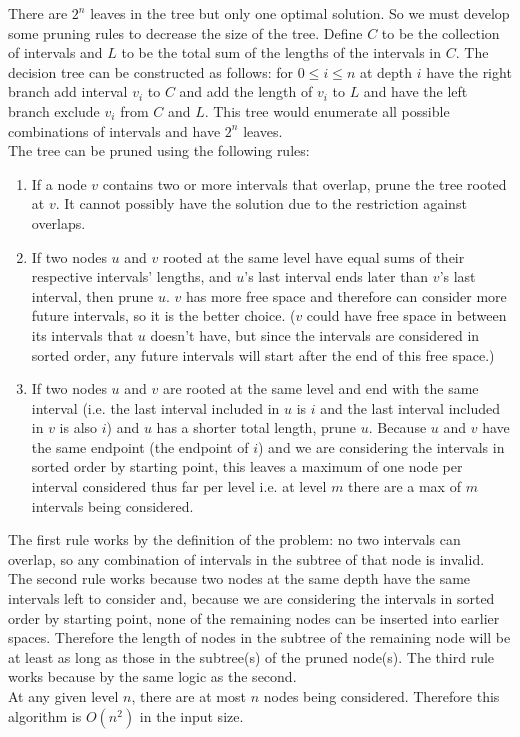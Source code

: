 \documentclass[letterpaper,notitlepage,twoside]{article}
\begin{document}
There are $2^n$ leaves in the tree but only one optimal solution. So we must develop some pruning rules to decrease the size of the tree.
Define $C$ to be the collection of intervals and $L$ to be the total sum of the lengths of the intervals in $C$. 
The decision tree can be constructed as follows: for $0 \leq i \leq n$ at depth $i$ have the right branch add interval $v_i$ to $C$ and add the length of $v_i$ to $L$ and have the left branch exclude $v_i$ from $C$ and $L$. This tree would enumerate all possible combinations of intervals and have $2^n$ leaves. \\
The tree can be pruned using the following rules:
\begin{enumerate}
\item If a node $v$ contains two or more intervals that overlap, prune the tree rooted at $v$. It cannot possibly have the solution due to the restriction against overlaps.
\item If two nodes $u$ and $v$ rooted at the same level have equal sums of their respective intervals' lengths, and $u$'s last interval ends later than $v$'s last interval, then prune $u$. $v$ has more free space and therefore can consider more future intervals, so it is the better choice. ($v$ could have free space in between its intervals that $u$ doesn't have, but since the intervals are considered in sorted order, any future intervals will start after the end of this free space.) 
\item If two nodes $u$ and $v$ are rooted at the same level and end with the same interval (i.e. the last interval included in $u$ is $i$ and the last interval included in $v$ is also $i$) and $u$ has a shorter total length, prune $u$. Because $u$ and $v$ have the same endpoint (the endpoint of $i$) and we are considering the intervals in sorted order by starting point, this leaves a maximum of one node per interval considered thus far per level i.e. at level $m$ there are a max of $m$ intervals being considered. 
\end{enumerate}
The first rule works by the definition of the problem: no two intervals can overlap, so any combination of intervals in the subtree of that node is invalid. The second rule works because two nodes at the same depth have the same intervals left to consider and, because we are considering the intervals in sorted order by starting point, none of the remaining nodes can be inserted into earlier spaces. Therefore the length of nodes in the subtree of the remaining node will be at least as long as those in the subtree(s) of the pruned node(s). The third rule works because by the same logic as the second. \\
At any given level $n$, there are at most $n$ nodes being considered. Therefore this algorithm is $O(n^2)$ in the input size.\\
\end{document}
